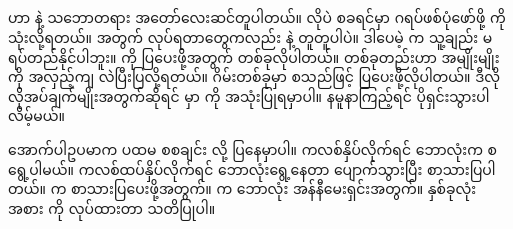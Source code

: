 \subsection*{}
 ဟာ  နဲ့ သဘောတရား အတော်လေးဆင်တူပါတယ်။  လိုပဲ စခရင်မှာ ဂရပ်ဖစ်ပုံဖော်ဖို့  ကို သုံးလို့ရတယ်။  အတွက်  လုပ်ရတာတွေကလည်း  နဲ့ တူတူပါပဲ။ ဒါပေမဲ့  က သူ့ချည်း မရပ်တည်နိုင်ပါဘူး။  ကို ပြပေးဖို့အတွက်  တစ်ခုလိုပါတယ်။  တစ်ခုတည်းဟာ  အမျိုးမျိုးကို အလှည့်ကျ လဲပြီးပြလို့ရတယ်။ ဂိမ်းတစ်ခုမှာ  စသည်ဖြင့် ပြပေးဖို့လိုပါတယ်။ ဒီလို လိုအပ်ချက်မျိုးအတွက်ဆိုရင်  မှာ  ကို အသုံးပြုရမှာပါ။  နမူနာကြည့်ရင် ပိုရှင်းသွားပါလိမ့်မယ်။

အောက်ပါဥပမာက ပထမ စစချင်း  လို့ ပြနေမှာပါ။  ကလစ်နှိပ်လိုက်ရင် ဘောလုံးက စရွေ့ပါမယ်။ ကလစ်ထပ်နှိပ်လိုက်ရင် ဘောလုံးရွေ့နေတာ ပျောက်သွားပြီး  စာသားပြပါတယ်။  က စာသားပြပေးဖို့အတွက်။
 က ဘောလုံး အန်နီမေးရှင်းအတွက်။ နှစ်ခုလုံး  အစား  ကို  လုပ်ထားတာ သတိပြုပါ။


